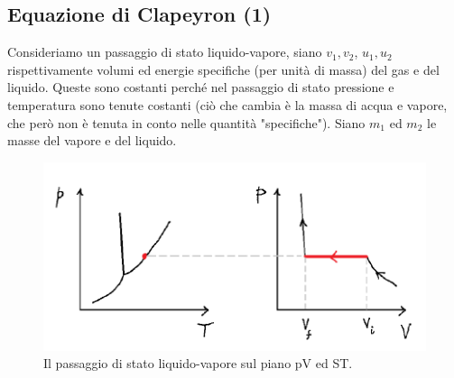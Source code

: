 \documentclass[
10pt, %
a4paper, %
oneside, %
headinclude,footinclude, %
BCOR5mm, %
]{scrartcl}
\begin{document}
\subsection{Equazione di Clapeyron (1)}\label{sec:equazione_clapeyron1}
Consideriamo un passaggio di stato liquido-vapore, siano \(v_1,v_2\), \(u_1,u_2\) rispettivamente volumi ed energie specifiche (per unità di massa) del gas e del liquido. Queste sono costanti perché nel passaggio di stato pressione e temperatura sono tenute costanti (ciò che cambia è la massa di acqua e vapore, che però non è tenuta in conto nelle quantità "specifiche"). Siano \(m_1\) ed \(m_2\) le masse del vapore e del liquido. 
\begin{figure}[h!]
	\centering
	\includegraphics[width=0.5\linewidth]{../images/equaz_passaggio_stato}
	\caption{Il passaggio di stato liquido-vapore sul piano pV ed ST.}
	\label{fig:equazpassaggiostato}
\end{figure}
\end{document}

